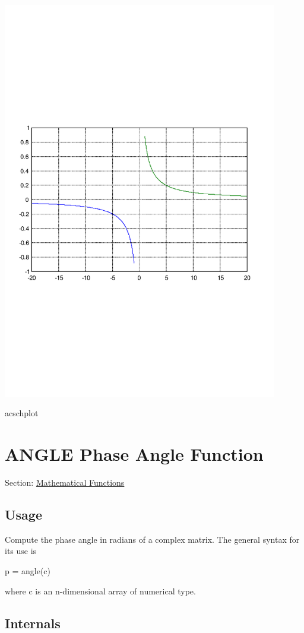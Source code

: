  
\begin{DoxyImage}
\includegraphics[width=12cm]{acschplot}
\caption{acschplot}
\end{DoxyImage}
 \hypertarget{mathfunctions_angle}{}\section{A\-N\-G\-L\-E Phase Angle Function}\label{mathfunctions_angle}
Section\-: \hyperlink{sec_mathfunctions}{Mathematical Functions} \hypertarget{vtkwidgets_vtkxyplotwidget_Usage}{}\subsection{Usage}\label{vtkwidgets_vtkxyplotwidget_Usage}
Compute the phase angle in radians of a complex matrix. The general syntax for its use is \begin{DoxyVerb}  p = angle(c)
\end{DoxyVerb}
 where {\ttfamily c} is an {\ttfamily n}-\/dimensional array of numerical type. \hypertarget{transforms_svd_Function}{}\subsection{Internals}\label{transforms_svd_Function}
